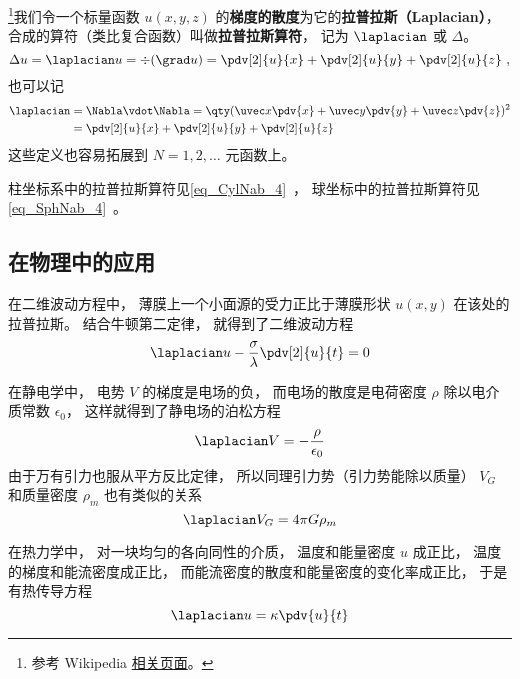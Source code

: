 

\footnote{参考 Wikipedia \href{https://en.wikipedia.org/wiki/Laplace_operator}{相关页面}。}我们令一个标量函数 $u(x, y, z)$ 的\textbf{梯度的散度}为它的\textbf{拉普拉斯（Laplacian）}， 合成的算符（类比复合函数）叫做\textbf{拉普拉斯算符}， 记为 $\laplacian$ 或 $\Delta$。
\begin{equation}
\Delta u = \laplacian u = \div (\grad u) = \pdv[2]{u}{x} + \pdv[2]{u}{y} + \pdv[2]{u}{z}~,
\end{equation}
也可以记
\begin{equation}
\begin{aligned}
\laplacian &= \Nabla \vdot \Nabla = \qty(\uvec x\pdv{x} + \uvec y\pdv{y} + \uvec z\pdv{z})^2\\
&= \pdv[2]{u}{x} + \pdv[2]{u}{y} + \pdv[2]{u}{z}
\end{aligned}
\end{equation}
这些定义也容易拓展到 $N = 1, 2, \dots$ 元函数上。

柱坐标系中的拉普拉斯算符见\autoref{eq_CylNab_4}~， 球坐标中的拉普拉斯算符见\autoref{eq_SphNab_4}~。

\subsection{在物理中的应用}
在二维波动方程中， 薄膜上一个小面源的受力正比于薄膜形状 $u(x, y)$ 在该处的拉普拉斯。 结合牛顿第二定律， 就得到了二维波动方程
\begin{equation}
\laplacian u - \frac{\sigma}{\lambda}\pdv[2]{u}{t} = 0
\end{equation}

在静电学中， 电势 $V$ 的梯度是电场的负， 而电场的散度是电荷密度 $\rho$ 除以电介质常数 $\epsilon_0$， 这样就得到了静电场的泊松方程
\begin{equation}
\laplacian V = -\frac{\rho}{\epsilon_0}
\end{equation}
由于万有引力也服从平方反比定律， 所以同理引力势（引力势能除以质量） $V_G$ 和质量密度 $\rho_m$ 也有类似的关系
\begin{equation}
\laplacian V_G = 4\pi G \rho_m
\end{equation}

在热力学中， 对一块均匀的各向同性的介质， 温度和能量密度 $u$ 成正比， 温度的梯度和能流密度成正比， 而能流密度的散度和能量密度的变化率成正比， 于是有热传导方程
\begin{equation}
\laplacian u = \kappa \pdv{u}{t}
\end{equation}
